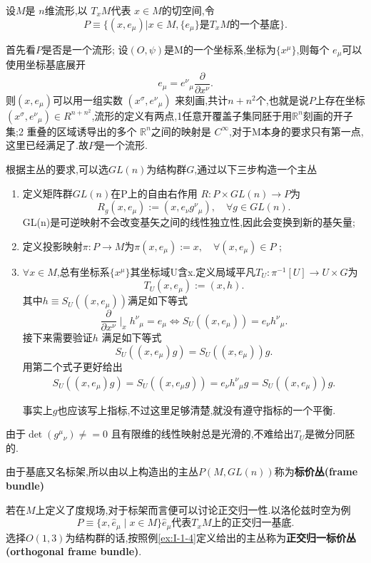 \documentclass[../main.tex]{subfiles}
\begin{document}
 \begin{example}
   \label{ex:I-1-4}
   设$M$是 $n$维流形,以 $T_xM$代表 $x\in M$的切空间,令\[
 P \equiv \{(x,e_\mu)| x \in  M, \{e_\mu\} \text{是}T_xM\text{的一个基底}\}
   .\]

   首先看$P$是否是一个流形;
   设$(O,\psi)$是M的一个坐标系,坐标为$\{x^\mu\}$,则每个 $e_\mu$可以使用坐标基底展开 \[
  e_\mu = e^{\nu}{}_{\mu} \frac{\partial }{\partial x^\nu}  
   .\] 
   则$(x,e_\mu)$可以用一组实数 $(x^\sigma,e^{\nu}{}_{\mu})$ 来刻画,共计$n + n^2$个,也就是说$P$上存在坐标
   $(x^\sigma,e^{\nu}{}_{\mu}) \in  R^{n + n^2}$,流形的定义有两点,1任意开覆盖子集同胚于用$\mathbb{R}^n$刻画的开子集;2
   重叠的区域诱导出的多个 $\mathbb{R}^n$之间的映射是 $C^\infty$,对于M本身的要求只有第一点,
   这里已经满足了.故$P$是一个流形.

   根据主丛的要求,可以选$GL(n)$为结构群$G$,通过以下三步构造一个主丛
   \begin{enumerate}
     \item 定义矩阵群$GL(n)$在P上的自由右作用 $R:P \times GL(n) \to P$为\[
         R_g(x,e_\mu) := (x,e_\nu g^{\nu}{}_{\mu}), \quad \forall g \in GL(n) 
     .\]
     GL(n)是可逆映射不会改变基矢之间的线性独立性,因此会变换到新的基矢量;
   \item 定义投影映射$\pi : P \to M$为$\pi(x,e_\mu) := x, \quad \forall (x,e_\mu) \in  P$ ;
   \item $\forall x \in M$,总有坐标系$\{x^\mu\}$其坐标域U含x.定义局域平凡$T_U : \pi^{-1} [U] \to  U \times G$为 \[
      T_U(x,e_\mu):= (x,h)
       .\]
     其中$h \equiv S_U((x,e_\mu))$满足如下等式 \[
    \frac{\partial   }{\partial x^\nu} \mid _x h^{\nu}{}_{\mu} = e_\mu \Leftrightarrow S_U((x,e_\mu)) = e_\nu h^{\nu}{}_{\mu}
     .\]
     接下来需要验证$h$ 满足如下等式\[
    S_U((x,e_\mu)g ) = S_U((x,e_\mu))g 
     .\] 
     用第二个式子更好给出
     \begin{align*}
      S_U((x,e_\mu)g) = S_U((x,e_\mu g)) = e_\nu h^{\nu}{}_{\mu}g = S_U((x,e_\mu))g
     .\end{align*}
     \begin{note}
       事实上$g$也应该写上指标,不过这里足够清楚,就没有遵守指标的一个平衡.
     \end{note}
   \end{enumerate}
   由于$\det(g^{\mu}{}_{\nu}) \neq = 0$ 且有限维的线性映射总是光滑的,不难给出$T_U$是微分同胚的.
 \end{example}

 由于基底又名标架,所以由以上构造出的主丛$P(M,GL(n))$称为\textbf{标价丛(frame bundle)}
 \begin{example}
 \label{ex:I-1-5}
 若在$M$上定义了度规场,对于标架而言便可以讨论正交归一性.以洛伦兹时空为例 \[
   P \equiv \{x, \hat{e}_\mu  \mid x \in M\} \hat{e}_\mu\text{代表}T_xM\text{上的正交归一基底} 
 .\] 
 选择$O(1,3)$为结构群的话,按照例\ref{ex:I-1-4}定义给出的主丛称为\textbf{正交归一标价丛(orthogonal frame bundle)}.

 \end{example}
\end{document}
